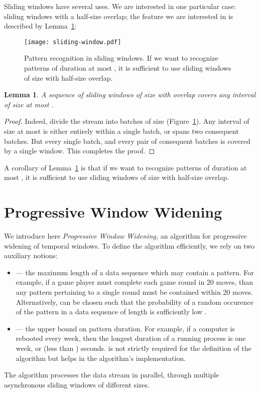 \documentclass[runningheads,a4paper]{llncs}
\newtheorem{lmm}{Lemma}
\begin{document}
Sliding windows have several uses. We are interested in one
particular case: sliding windows with a half-size overlap; the
feature we are interested in is described by Lemma~\ref{lmm:sliding}:
\begin{figure}
    \centering
	\texttt{[image: sliding-window.pdf]}
	\caption{Pattern recognition in sliding windows. If we want to
recognize patterns of duration at most , it is sufficient to use
sliding windows of size  with half-size overlap.}
    \label{fig:sliding-window}
\end{figure}
\begin{lmm}
    \label{lmm:sliding}
A sequence of sliding windows of size  with overlap 
covers any interval of size at most .
\end{lmm}
\begin{proof}
    Indeed, divide the stream into batches of size 
    (Figure~\ref{fig:sliding-window}). Any
    interval of size at most   is either entirely within a
    single batch, or spans two consequent batches. But every
    single batch, and every pair of consequent batches is
    covered by a single window. This completes the proof.
\end{proof}
A corollary of Lemma~\ref{lmm:sliding} is that if we want to
recognize patterns of duration at most , it is sufficient to use
sliding windows of size  with half-size overlap.

\section{Progressive Window Widening}
\label{sec:pww}

We introduce here \textit{Progressive Window Widening,} an
algorithm for progressive widening of temporal windows. To
define the algorithm efficiently, we rely on two auxiliary
notions:
\begin{itemize}
	\item  --- the maximum length of a data sequence which 
		may contain a pattern. For example, if a game player must
		complete each game round in 20 moves, than any pattern
		pertaining to a single round must be contained within 20
		moves. Alternatively,  can be chosen such that
		the probability of a random occurence of the pattern
		in a data sequence of length  is sufficiently
		low \cite{GAS03}.
    \item  --- the upper bound on pattern duration.
        For example, if a computer is rebooted every week, then
        the longest duration of a running process is one week,
        or  (less than ) seconds.  
        is not strictly required for the definition of the
        algorithm but helps in the algorithm's implementation.
\end{itemize}
The algorithm processes the data stream in parallel, through
multiple asynchronous sliding windows of different sizes.
\end{document}
